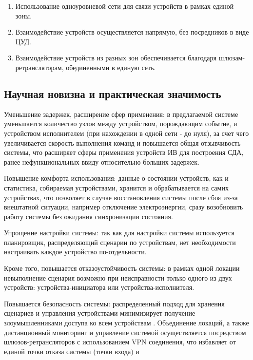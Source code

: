 \documentclass[a4paper,12pt]{article}
\begin{document}
\begin{enumerate}
    \item Использование одноуровневой сети для связи устройств в рамках единой зоны.
    \item Взаимодействие устройств осуществляется напрямую, без посредников в виде ЦУД.
    \item Взаимодействие устройств из разных зон обеспечивается благодаря шлюзам-ретрансляторам, обединенными в единую сеть.
\end{enumerate}

\subsection{Научная новизна и практическая значимость}
Уменьшение задержек, расширение сфер применения: в предлагаемой системе уменьшается количество узлов между устройством, порождающим событие, и устройством исполнителем (при нахождении в одной сети - до нуля), за счет чего увеличивается скорость выполнения команд и повышается общая отзывчивость системы, что расширяет сферы применения устройств ИВ для построения СДА, ранее нефункциональных ввиду относительно больших задержек.

Повышение комфорта использования: данные о состоянии устройств, как и статистика, собираемая устройствами, хранится и обрабатывается на самих устройствах, что позволяет в случае восстановления системы после сбоя из-за внештатной ситуации, например отключение электроэнергии, сразу возобновить работу системы без ожидания синхронизации состояния.

Упрощение настройки системы: так как для настройки системы используется планировщик, распределяющий сценарии по устройствам, нет необходимости настраивать каждое устройство по-отдельности.

Кроме того, повышается отказоустойчивость системы: в рамках одной локации невыполнение сценария возможно при неисправности только одного из двух устройств: устройства-инициатора или устройства-исполнителя.

Повышается безопасность системы: распределенный подход для хранения сценариев и управления устройствами минимизирует получение злоумышленниками доступа ко всем устройствам . Объединение локаций, а также дистанционный мониторинг и управление системой осуществляется посредством шлюзов-ретрансляторов с использованием VPN соединения, что избавляет от единой точки отказа системы (точки входа) и 
\end{document}
